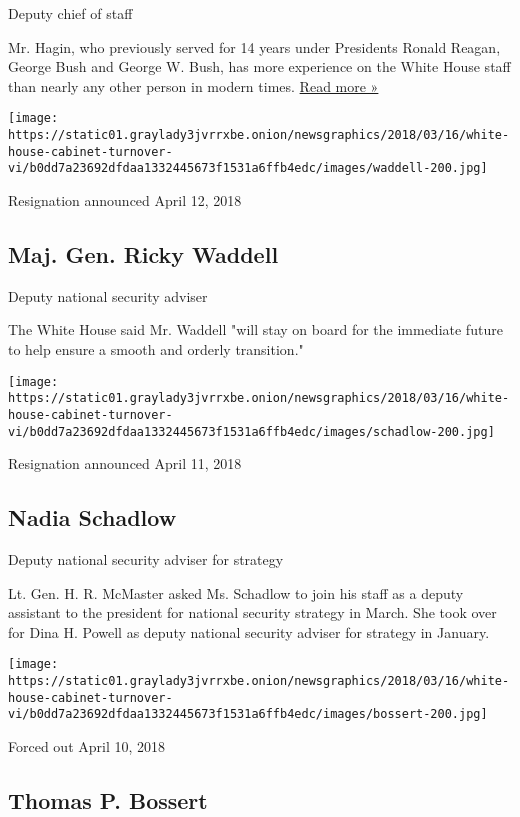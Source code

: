 Deputy chief of staff

Mr. Hagin, who previously served for 14 years under Presidents Ronald
Reagan, George Bush and George W. Bush, has more experience on the White
House staff than nearly any other person in modern times.
\href{https://www.nytimes3xbfgragh.onion/2018/06/19/us/politics/joe-hagin-retires-trump-white-house.html}{Read
more »}

\texttt{[image: https://static01.graylady3jvrrxbe.onion/newsgraphics/2018/03/16/white-house-cabinet-turnover-vi/b0dd7a23692dfdaa1332445673f1531a6ffb4edc/images/waddell-200.jpg]}

Resignation announced April 12, 2018

\hypertarget{maj-gen-ricky-waddell}{%
\subsection{Maj. Gen. Ricky Waddell}\label{maj-gen-ricky-waddell}}

Deputy national security adviser

The White House said Mr. Waddell "will stay on board for the immediate
future to help ensure a smooth and orderly transition."

\texttt{[image: https://static01.graylady3jvrrxbe.onion/newsgraphics/2018/03/16/white-house-cabinet-turnover-vi/b0dd7a23692dfdaa1332445673f1531a6ffb4edc/images/schadlow-200.jpg]}

Resignation announced April 11, 2018

\hypertarget{nadia-schadlow}{%
\subsection{Nadia Schadlow}\label{nadia-schadlow}}

Deputy national security adviser for strategy

Lt. Gen. H. R. McMaster asked Ms. Schadlow to join his staff as a deputy
assistant to the president for national security strategy in March. She
took over for Dina H. Powell as deputy national security adviser for
strategy in January.

\texttt{[image: https://static01.graylady3jvrrxbe.onion/newsgraphics/2018/03/16/white-house-cabinet-turnover-vi/b0dd7a23692dfdaa1332445673f1531a6ffb4edc/images/bossert-200.jpg]}

Forced out April 10, 2018

\hypertarget{thomas-p-bossert}{%
\subsection{Thomas P. Bossert}\label{thomas-p-bossert}}

